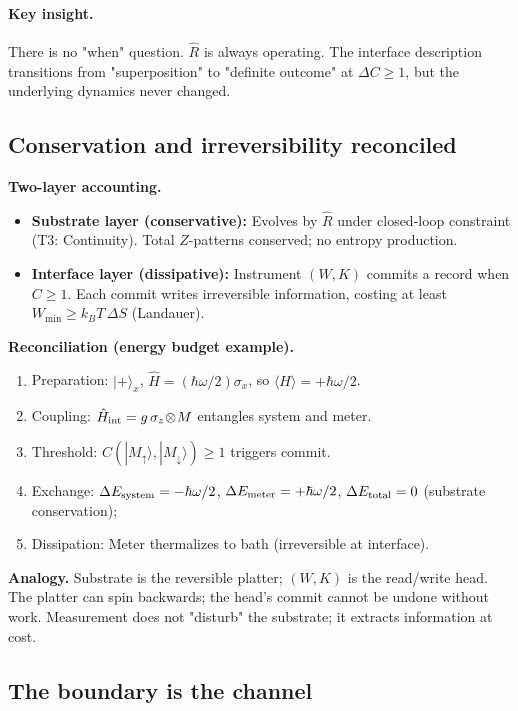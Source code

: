 \documentclass[11pt]{article}
\begin{document}
\paragraph{Key insight.} There is no "when" question. $\hat R$ is always operating. The interface description transitions from "superposition" to "definite outcome" at $\Delta C\!\ge\!1$, but the underlying dynamics never changed.

\subsection{Conservation and irreversibility reconciled}

\textbf{Two-layer accounting.}
\begin{itemize}[leftmargin=*]
  \item \textbf{Substrate layer (conservative):} Evolves by $\hat R$ under closed-loop constraint (T3: Continuity). Total $Z$-patterns conserved; no entropy production.
  \item \textbf{Interface layer (dissipative):} Instrument $(W,K)$ commits a record when $C\!\ge\!1$. Each commit writes irreversible information, costing at least $W_{\min} \ge k_B T\,\Delta S$ (Landauer).
\end{itemize}

\textbf{Reconciliation (energy budget example).}
\begin{enumerate}[nosep]
  \item Preparation: $|+\rangle_x$, $\hat H=(\hbar\omega/2)\sigma_x$, so $\langle H\rangle=+\hbar\omega/2$.
  \item Coupling: $\hat H_{\rm int}=g\,\sigma_z\!\otimes\!M$ entangles system and meter.
  \item Threshold: $C(|M_\uparrow\rangle,|M_\downarrow\rangle)\!\ge\!1$ triggers commit.
  \item Exchange: $\Delta E_{\rm system}= -\hbar\omega/2$, $\Delta E_{\rm meter}= +\hbar\omega/2$, $\Delta E_{\rm total}=0$ (substrate conservation);
  \item Dissipation: Meter thermalizes to bath (irreversible at interface).
\end{enumerate}

\textbf{Analogy.} Substrate is the reversible platter; $(W,K)$ is the read/write head. The platter can spin backwards; the head's commit cannot be undone without work. Measurement does not "disturb" the substrate; it extracts information at cost.

\subsection{The boundary is the channel}
\end{document}
